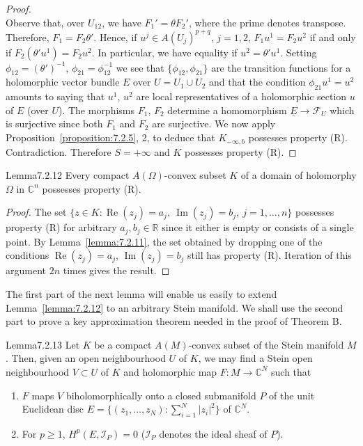 \begin{proof}
\[\]
Observe that, over $U_{12}$, we have $F_1'=\theta F_2'$, where the prime denotes transpose. Therefore, $F_1=F_2\theta'$. Hence, if $u^j\in A(U_j)^{p+q}$, $j=1,2$, $F_1u^1=F_2u^2$ if and only if $F_2(\theta'u^1)=F_2u^2$. In particular, we have equality if $u^2=\theta'u^1$. Setting $\phi_{12}=(\theta')^{-1}$, $\phi_{21}=\phi_{12}^{-1}$ we see that $\{\phi_{12},\phi_{21}\}$ are the transition functions for a holomorphic vector bundle $E$ over $U=U_1\cup U_2$ and that the condition $\phi_{21}u^1=u^2$ amounts to saying that $u^1$, $u^2$ are local representatives of a holomorphic section $u$ of $E$ (over $U$). The morphisms $F_1$, $F_2$ determine a homomorphism $\underline E\to\mathcal F_U$ which is surjective since both $F_1$ and $F_2$ are surjective. We now apply Proposition~\ref{proposition:7.2.5}, 2, to deduce that $K_{-\infty,b}$ possesses property (R). Contradiction. Therefore $S=+\infty$ and $K$ possesses property (R).
\end{proof}
\begin{originaltheorem}{Lemma}{7.2.12}
Every compact $A(\Omega)$-convex subset $K$ of a domain of holomorphy $\Omega$ in $\mathbb C^n$ possesses property (R).
\end{originaltheorem}
\begin{proof}
The set $\{z\in K:\operatorname{Re}(z_j)=a_j,\ \operatorname{Im}(z_j)=b_j,\ j=1,\ldots,n\}$ possesses property (R) for arbitrary $a_j,b_j\in\mathbb R$ since it either is empty or consists of a single point. By Lemma~\ref{lemma:7.2.11}, the set obtained by dropping one of the conditions $\operatorname{Re}(z_j)=a_j$, $\operatorname{Im}(z_j)=b_j$ still has property (R). Iteration of this argument $2n$ times gives the result.
\end{proof}
The first part of the next lemma will enable us easily to extend Lemma~\ref{lemma:7.2.12} to an arbitrary Stein manifold. We shall use the second part to prove a key approximation theorem needed in the proof of Theorem B.
\begin{originaltheorem}{Lemma}{7.2.13}
Let $K$ be a compact $A(M)$-convex subset of the Stein manifold $M$. Then, given an open neighbourhood $U$ of $K$, we may find a Stein open neighbourhood $V\subset U$ of $K$ and holomorphic map $F:M\to\mathbb C^N$ such that
\begin{enumerate}[label=\arabic*.]
\item $F$ maps $V$ biholomorphically onto a closed submanifold $P$ of the unit Euclidean disc $E=\{(z_1,\ldots,z_N):\sum_{i=1}^N|z_i|^2\}$ of $\mathbb C^N$.
\item For $p\geq1$, $H^p(E,\mathcal I_P)=0$ ($\mathcal I_P$ denotes the ideal sheaf of $P$).
\end{enumerate}
\end{originaltheorem}

